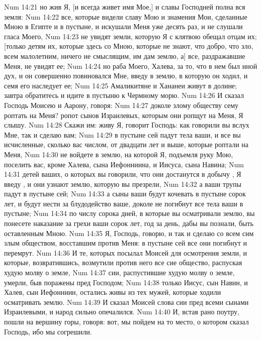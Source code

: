 \vs Num 14:21 но жив Я, [и всегда живет имя Мое,] и славы Господней полна вся земля:
\vs Num 14:22 все, которые видели славу Мою и знамения Мои, сделанные Мною в Египте и в пустыне, и искушали Меня уже десять раз, и не слушали гласа Моего,
\vs Num 14:23 не увидят земли, которую Я с клятвою обещал отцам их; [только детям их, которые здесь со Мною, которые не знают, что добро, что зло, всем малолетним, ничего не смыслящим, им дам землю, а] все, раздражавшие Меня, не увидят ее;
\vs Num 14:24 но раба Моего, Халева, за то, что в нем был иной дух, и он совершенно повиновался Мне, введу в землю, в которую он ходил, и семя его наследует ее;
\vs Num 14:25 Амаликитяне и Хананеи живут в долине; завтра обратитесь и идите в пустыню к Чермному морю.
\rsbpar\vs Num 14:26 И сказал Господь Моисею и Аарону, говоря:
\vs Num 14:27 доколе злому обществу сему роптать на Меня? ропот сынов Израилевых, которым они ропщут на Меня, Я слышу.
\vs Num 14:28 Скажи им: живу Я, говорит Господь: как говорили вы вслух Мне, так и сделаю вам;
\vs Num 14:29 в пустыне сей падут тела ваши, и все вы исчисленные, сколько вас числом, от двадцати лет и выше, которые роптали на Меня,
\vs Num 14:30 не войдете в землю, на которой Я, подъемля руку Мою,  поселить вас, кроме Халева, сына Иефонниина, и Иисуса, сына Навина;
\vs Num 14:31 детей ваших, о которых вы говорили, что они достанутся в добычу , Я введу , и они узнают землю, которую вы презрели,
\vs Num 14:32 а ваши трупы падут в пустыне сей;
\vs Num 14:33 а сыны ваши будут кочевать в пустыне сорок лет, и будут нести  за блудодейство ваше, доколе не погибнут все тела ваши в пустыне;
\vs Num 14:34 по числу сорока дней, в которые вы осматривали землю, вы понесете наказание за грехи ваши сорок лет, год за день, дабы вы познали,  быть оставленным Мною.
\vs Num 14:35 Я, Господь, говорю, и так и сделаю со всем сим злым обществом, восставшим против Меня: в пустыне сей все они погибнут и перемрут.
\vs Num 14:36 И те, которых посылал Моисей для осмотрения земли, и которые, возвратившись, возмутили против него все сие общество, распуская худую молву о земле,
\vs Num 14:37 сии, распустившие худую молву о земле, умерли, быв поражены пред Господом;
\vs Num 14:38 только Иисус, сын Навин, и Халев, сын Иефонниин, остались живы из тех мужей, которые ходили осматривать землю.
\rsbpar\vs Num 14:39 И сказал Моисей слова сии пред всеми сынами Израилевыми, и народ сильно опечалился.
\vs Num 14:40 И, встав рано поутру, пошли на вершину горы, говоря: вот, мы пойдем на то место, о котором сказал Господь, ибо мы согрешили.
